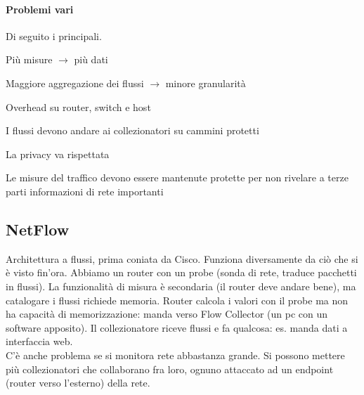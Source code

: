 \documentclass[10pt]{book}
\begin{document}
\paragraph{Problemi vari} Di seguito i principali.
\begin{multicols}{2}
\begin{list}{}{\textbf{Overhead vs accuratezza}}
	\item Più misure $\rightarrow$ più dati
	\item Maggiore aggregazione dei flussi $\rightarrow$ minore granularità
	\item Overhead su router, switch e host
\end{list}
\columnbreak
\begin{list}{}{\textbf{Security vs data sharing}}
	\item I flussi devono andare ai collezionatori su cammini protetti
	\item La privacy va rispettata
	\item Le misure del traffico devono essere mantenute protette per non rivelare a terze parti informazioni di rete importanti
\end{list}
\end{multicols}
\subsection{NetFlow} Architettura a flussi, prima coniata da Cisco. Funziona diversamente da ciò che si è visto fin'ora. Abbiamo un router con un probe (sonda di rete, traduce pacchetti in flussi). La funzionalità di misura è secondaria (il router deve andare bene), ma catalogare i flussi richiede memoria. Router calcola i valori con il probe ma non ha capacità di memorizzazione: manda verso Flow Collector (un pc con un software apposito). Il collezionatore riceve flussi e fa qualcosa: es. manda dati a interfaccia web.\\
C'è anche problema se si monitora rete abbastanza grande. Si possono mettere più collezionatori che collaborano fra loro, ognuno attaccato ad un endpoint (router verso l'esterno) della rete.
\end{document}
